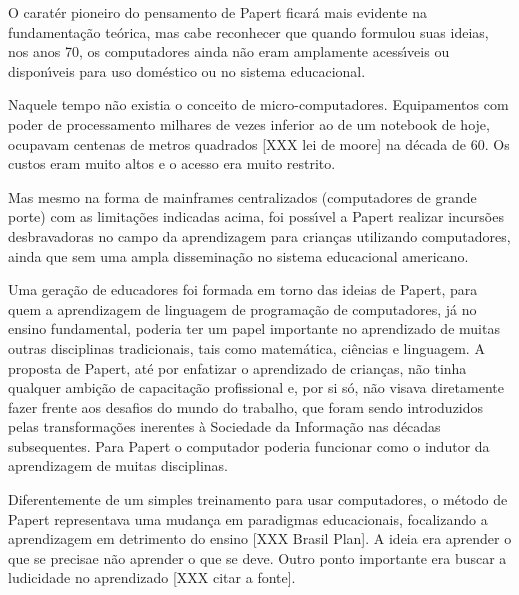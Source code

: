\documentclass[
12pt,		%
openright,	%
twoside,  %
a4paper,			%
chapter=TITLE,		%
english,			%
french,				%
spanish,			%
brazil				%
]{USPSC-classe/USPSC}
\begin{document}
O carat\'er pioneiro do pensamento de Papert ficar\'a mais evidente na fundamenta\c{c}\~ao te\'orica, mas cabe reconhecer que quando formulou suas ideias, nos anos 70, os computadores  ainda n\~ao eram amplamente acess\'{\i}veis ou dispon\'{\i}veis para uso dom\'estico ou no sistema educacional.










Naquele tempo n\~ao existia o conceito de \textquotedbl micro-computadores\textquotedbl . Equipamentos com poder de processamento milhares de vezes inferior ao de um notebook de hoje, ocupavam centenas de metros quadrados [XXX lei de moore] na d\'ecada de 60. Os custos eram muito altos e o acesso era muito restrito.










Mas mesmo na forma de mainframes centralizados (computadores de grande porte) com as limita\c{c}\~oes indicadas acima, foi poss\'{\i}vel a Papert realizar incurs\~oes desbravadoras no campo da aprendizagem para crian\c{c}as utilizando computadores, ainda que sem uma ampla dissemina\c{c}\~ao no sistema educacional americano.










Uma gera\c{c}\~ao de educadores foi formada em torno das ideias de Papert, para quem a aprendizagem de linguagem de programa\c{c}\~ao de computadores, j\'a no ensino fundamental, poderia ter um papel importante no aprendizado de muitas outras disciplinas tradicionais, tais como matem\'atica, ci\^encias e linguagem. A proposta de Papert, at\'e por enfatizar o aprendizado de crian\c{c}as, n\~ao tinha qualquer ambi\c{c}\~ao de capacita\c{c}\~ao profissional e, por si s\'o, n\~ao visava diretamente fazer frente aos desafios do \textquotedbl mundo do trabalho\textquotedbl , que foram sendo introduzidos pelas transforma\c{c}\~oes inerentes \`a Sociedade da Informa\c{c}\~ao nas d\'ecadas subsequentes. Para Papert o computador poderia funcionar como o indutor da aprendizagem de muitas disciplinas.










Diferentemente de um simples treinamento para usar computadores, o m\'etodo de Papert representava uma mudan\c{c}a em paradigmas educacionais, focalizando a aprendizagem em detrimento do ensino [XXX Brasil Plan]. A ideia era \textquotedbl aprender o que se precisa\textquotedbl  e n\~ao \textquotedbl aprender o que se deve. Outro ponto importante era buscar a ludicidade no aprendizado [XXX citar a fonte].
\end{document}

